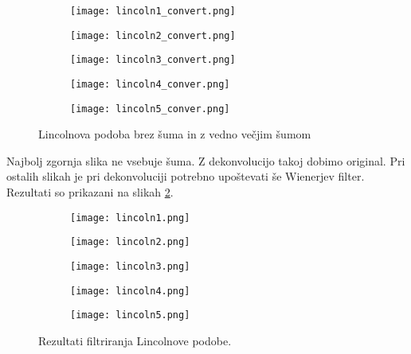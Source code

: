 \documentclass[12pt,a4paper]{article}
\begin{document}
\begin{figure}[H]
    \centering
    \begin{subfigure}[b]{0.4\textwidth}
        \texttt{[image: lincoln1\_convert.png]}
    \end{subfigure}
    
    \begin{subfigure}[b]{0.3\textwidth}
        \texttt{[image: lincoln2\_convert.png]}
    \end{subfigure}
    \begin{subfigure}[b]{0.3\textwidth}
        \texttt{[image: lincoln3\_convert.png]}
    \end{subfigure}
    
    \begin{subfigure}[b]{0.3\textwidth}
        \texttt{[image: lincoln4\_conver.png]}
    \end{subfigure}
    \begin{subfigure}[b]{0.3\textwidth}
        \texttt{[image: lincoln5\_conver.png]}
    \end{subfigure}
    \caption{Lincolnova podoba brez šuma in z vedno večjim šumom} \label{fig:slika14}
\end{figure}
\noindent Najbolj zgornja slika ne vsebuje šuma. Z dekonvolucijo takoj dobimo original. Pri ostalih slikah je pri dekonvoluciji potrebno upoštevati še Wienerjev filter. Rezultati so prikazani na slikah \ref{fig:slika15}.

\begin{figure}[H]
    \centering
    \begin{subfigure}[b]{0.4\textwidth}
        \texttt{[image: lincoln1.png]}
    \end{subfigure}
    
    \begin{subfigure}[b]{0.3\textwidth}
        \texttt{[image: lincoln2.png]}
    \end{subfigure}
    \begin{subfigure}[b]{0.3\textwidth}
        \texttt{[image: lincoln3.png]}
    \end{subfigure}
    
    \begin{subfigure}[b]{0.3\textwidth}
        \texttt{[image: lincoln4.png]}
    \end{subfigure}
    \begin{subfigure}[b]{0.3\textwidth}
        \texttt{[image: lincoln5.png]}
    \end{subfigure}
    \caption{Rezultati filtriranja Lincolnove podobe.} \label{fig:slika15}
\end{figure}
\end{document}
